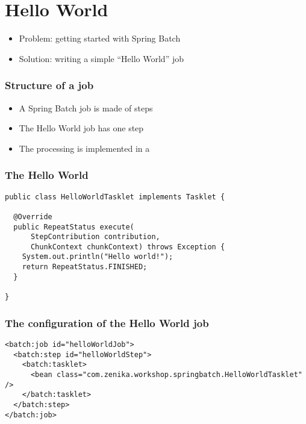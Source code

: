 \section{Hello World}

\begin{frame}
 \begin{itemize}
  \item Problem: getting started with Spring Batch
  \item Solution: writing a simple ``Hello World'' job
 \end{itemize}
\end{frame}

\begin{frame}
 \frametitle{Structure of a job}
 \begin{itemize}
  \item A Spring Batch job is made of steps
  \item The Hello World job has one step
  \item The processing is implemented in a 
 \end{itemize}
\end{frame}

\begin{frame}[fragile]
\frametitle{The Hello World }
\lstset{language=Java}
\begin{lstlisting}
public class HelloWorldTasklet implements Tasklet {

  @Override
  public RepeatStatus execute(
      StepContribution contribution,
      ChunkContext chunkContext) throws Exception {
    System.out.println("Hello world!");
    return RepeatStatus.FINISHED;
  }

}
\end{lstlisting}
\end{frame}

\begin{frame}[fragile]
\frametitle{The configuration of the Hello World job}
\lstset{language=XML}
\begin{lstlisting}
<batch:job id="helloWorldJob">
  <batch:step id="helloWorldStep">
    <batch:tasklet>
      <bean class="com.zenika.workshop.springbatch.HelloWorldTasklet" />
    </batch:tasklet>
  </batch:step>
</batch:job>
\end{lstlisting}
\end{frame}

